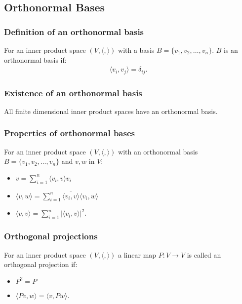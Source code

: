 \documentclass[a4paper, 12pt, twoside]{article}
\begin{document}
\subsection{Orthonormal Bases}

\subsubsection{Definition of an orthonormal basis}

For an inner product space $(V, \langle , \rangle)$ with a basis
$B = \{v_1, v_2, \ldots, v_n\}$. $B$ is an orthonormal basis
if:
\begin{align*}
  \langle v_i,v_j \rangle = \delta_{ij}.
\end{align*}

\subsubsection{Existence of an orthonormal basis}

All finite dimensional inner product spaces have an orthonormal
basis.

\subsubsection{Properties of orthonormal bases}

For an inner product space $(V, \langle , \rangle)$ with an
orthonormal basis $B = \{v_1, v_2, \ldots, v_n\}$ and
$v, w$ in $V$:
\begin{itemize}
  \item $v = \sum_{i = 1}^n \langle v_i,v \rangle v_i$
  \item $\langle v, w \rangle = \sum_{i = 1}^n 
    \overline{\langle v_i,v \rangle}\langle v_i,w \rangle$
  \item $\langle v, v \rangle = \sum_{i = 1}^n |\langle v_i, v \rangle|^2$.
\end{itemize}

\subsubsection{Orthogonal projections}

For an inner product space $(V, \langle , \rangle)$ a linear map
$P: V \to V$ is called an orthogonal projection if:
\begin{itemize}
  \item $P^2 = P$
  \item $\langle Pv,w \rangle = \langle v,Pw \rangle$.
\end{itemize}
\end{document}
